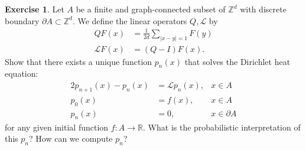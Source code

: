 \documentclass[a4paper,11pt]{article}
\theoremstyle{definition}
\newtheorem{exercise}{Exercise}
\begin{document}
\begin{exercise}
	Let $A$ be a finite and graph-connected subset of $\mathbb{Z}^d$ with discrete boundary $\partial A \subset \mathbb{Z}^d$. We define the linear operators $Q, \mathcal{L}$ by
	\begin{align*}
		Q F(x) &= \frac{1}{2d} \sum_{|x-y| = 1} F(y) \\
		\mathcal{L} F (x) &= (Q - I) F (x).
	\end{align*}
	Show that there exists a unique function $p_n(x)$ that solves the Dirichlet heat equation:
	\begin{alignat*}{2}
		p_{n+1}(x) - p_n(x) &= \mathcal{L}p_n(x) ,& x \in A \\
		p_0(x) &= f(x) ,& x \in A \\
		p_n(x) &= 0 ,& x \in \partial A
	\end{alignat*}
	for any given initial function $f: A \to \mathbb{R}$. What is the probabilistic interpretation of this $p_n$? How can we compute $p_n$?
\end{exercise}
\end{document}
